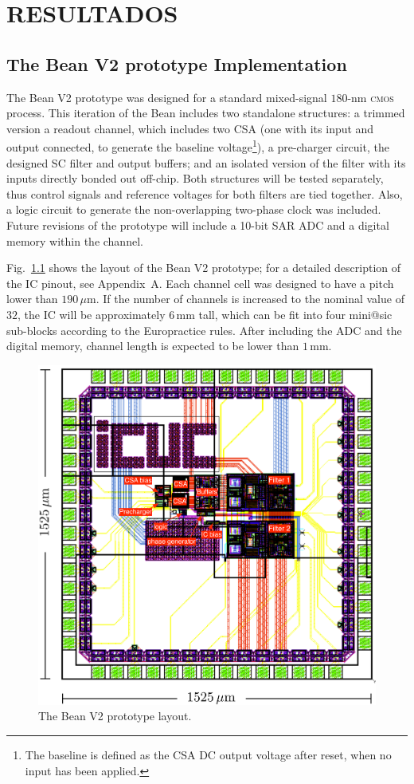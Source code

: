 \chapter{RESULTADOS}
\label{chapter:results}

\section{The Bean V2 prototype Implementation}
The Bean V2 prototype was designed for a standard mixed-signal $180\text{-nm}$ \textsc{cmos} process. This iteration of the Bean includes two standalone structures: a trimmed version a readout channel, which includes two CSA (one with its input and output connected, to generate the baseline voltage\footnote{The baseline is defined as the CSA DC output voltage after reset, when no input has been applied.}), a pre-charger circuit, the designed SC filter and output buffers; and an isolated version of the filter with its inputs directly bonded out off-chip.  Both structures will be tested separately, thus control signals and reference voltages for both filters are tied together. Also, a logic circuit to generate the non-overlapping two-phase clock was included. Future revisions of the prototype will include a 10-bit SAR ADC and a digital memory within the channel.

Fig.~\ref{fig:IC_layout} shows the layout of the Bean V2 prototype; for a detailed description of the IC pinout, see Appendix~A. Each channel cell was designed to have a pitch lower than $190\,\mu\text{m}$. If the number of channels is increased to the nominal value of $32$, the IC will be approximately $6\,\text{mm}$ tall, which can be fit into four mini@sic sub-blocks according to the Europractice rules. After including the ADC and the digital memory, channel length is expected to be lower than $1\,\text{mm}$.

\begin{figure}[!t]
	\centering
	\includegraphics[width=5in]{./Figures/IC_layout}
	\caption{The Bean V2 prototype layout.}\label{fig:IC_layout}
\end{figure}

